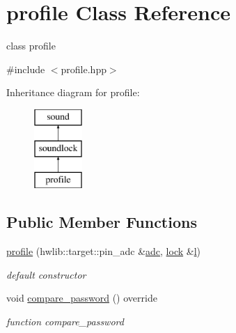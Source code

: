 \hypertarget{classprofile}{}\section{profile Class Reference}
\label{classprofile}


class profile  




{\ttfamily \#include $<$profile.\+hpp$>$}

Inheritance diagram for profile\+:\begin{figure}[H]
\begin{center}
\leavevmode
\includegraphics[height=3.000000cm]{classprofile}
\end{center}
\end{figure}
\subsection*{Public Member Functions}
\begin{DoxyCompactItemize}
\item 
\hyperlink{classprofile_aa556404d805d160561f593b02789c5d6}{profile} (hwlib\+::target\+::pin\+\_\+adc \&\hyperlink{classsound_a1b4c38e994daa1b3e9006852d3d9242a}{adc}, \hyperlink{classlock}{lock} \&\hyperlink{classsoundlock_ade415e22f230dca2d7e7f93d14cec8b6}{l})
\begin{DoxyCompactList}\small\item\em default constructor \end{DoxyCompactList}\item 
void \hyperlink{classprofile_acefbce03d19dafccbcf55c17b3527a23}{compare\+\_\+password} () override
\begin{DoxyCompactList}\small\item\em function compare\+\_\+password \end{DoxyCompactList}\end{DoxyCompactItemize}
